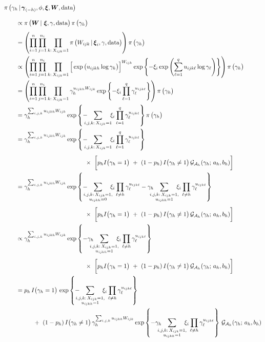 \documentclass[11pt]{article}
\renewcommand{\vec}{\boldsymbol}
\newcommand{\barS}{\,|\,}
\newcommand{\ind}{I}
\newcommand{\gammaExpr}{ -\hspace{3mm} \sum_{\mathclap{i,j,k{:}\, X_{ijk}=1}} \hspace{4mm} \xi_i \prod_{\ell=1}^q \gamma_\ell^{ u_{ijk\ell} } }
\newcommand{\gammaExprUisZero}{ \hspace{3mm} \sum_{\mathclap{\substack{i,j,k{:}\, X_{ijk}=1, \\ u_{ijkh} = 0}}} \hspace{4mm} \xi_i \prod_{\ell \ne h} \gamma_\ell^{ u_{ijk\ell} } }
\newcommand{\gammaExprUisOne}{ \hspace{3mm} \sum_{\mathclap{\substack{i,j,k{:}\, X_{ijk}=1, \\ u_{ijkh} = 1}}} \hspace{4mm} \xi_i \prod_{\ell \ne h} \gamma_\ell^{ u_{ijk\ell} } }
\begin{document}
\begin{enumerate}[label=Step \arabic*., leftmargin=13mm, itemsep=10mm]
\begin{align*} \MoveEqLeft
\pi\, \big( \gamma_h \barS \vec{\gamma}_{(-h)}, \phi, \vec{\xi}, \vec{W}, \text{data} \big) \\[2ex]
& \propto \pi\, \big( \vec{W} \barS\, \vec{\xi}, \gamma, \text{data} \big)\, \pi\,\big( \gamma_h \big) \\[1ex]
&= \left( \prod_{i=1}^{n} \prod_{j=1}^{n_i} \prod_{k{:}\, X_{ijk} = 1} \pi\, \big( W_{ijk} \barS \vec{\xi}_i, \gamma, \text{data} \big) \right) \pi\, \big( \gamma_h \big) \\
&\propto \left( \prod_{i=1}^{n} \prod_{j=1}^{n_i} \prod_{k{:}\, X_{ijk} = 1} \Big[ \exp\big( u_{ijkh} \log \gamma_h \big) \Big]^{W_{ijk}} \exp\left\{ -\xi_i \exp\left( \sum_{\ell=1}^q u_{ijk\ell} \log \gamma_{\ell} \right) \right\} \right) \pi\, \big( \gamma_h \big) \\
&= \left( \prod_{i=1}^{n} \prod_{j=1}^{n_i} \prod_{k{:}\, X_{ijk} = 1} \gamma_h^{ u_{ijkh} W_{ijk} } \exp\left\{ -\xi_i \prod_{\ell=1}^q \gamma_\ell^{ u_{ijk\ell} } \right\} \right) \pi\, \big( \gamma_h \big) \\
&= \gamma_h^{ \sum_{i,j,k} u_{ijkh} W_{ijk} } \exp\left\{ \gammaExpr \right\} \pi\, \big( \gamma_h \big) \\
&= \gamma_h^{ \sum_{i,j,k} u_{ijkh} W_{ijk} } \exp\left\{ \gammaExpr \right\} \\[1ex]
& \hspace{40mm} \times~ \bigg[ p_h \ind\big( \gamma_h = 1 \big) ~+~ (1 - p_h)\, \ind\big( \gamma_h \ne 1 \big)\, \mathcal{G}_{\mathcal{A}_h} (\gamma_h;\, a_h,b_h) \bigg] \\
&= \gamma_h^{ \sum_{i,j,k} u_{ijkh} W_{ijk} } \exp\left\{ -\gammaExprUisZero-\gamma_h\gammaExprUisOne \right\} \\[1ex]
& \hspace{40mm} \times~ \bigg[ p_h \ind\big( \gamma_h = 1 \big) ~+~ (1 - p_h)\, \ind\big( \gamma_h \ne 1 \big)\, \mathcal{G}_{\mathcal{A}_h} (\gamma_h;\, a_h,b_h) \bigg] \\
&\propto \gamma_h^{ \sum_{i,j,k} u_{ijkh} W_{ijk} } \exp\left\{-\gamma_h\gammaExprUisOne \right\} \\[1ex]
& \hspace{40mm} \times~ \bigg[ p_h \ind\big( \gamma_h = 1 \big) ~+~ (1 - p_h)\, \ind\big( \gamma_h \ne 1 \big)\, \mathcal{G}_{\mathcal{A}_h} (\gamma_h;\, a_h,b_h) \bigg] \\
&= p_h\, \ind\big( \gamma_h = 1 \big)\, \exp\left\{ -\gammaExprUisOne \right\} \\
& \hspace{10mm} +~ (1 - p_h)\, \ind\big(\gamma_h \ne 1 \big)\, \gamma_h^{ \sum_{i,j,k} u_{ijkh} W_{ijk} } \exp\left\{ -\gamma_h\gammaExprUisOne \right\} \, \mathcal{G}_{\mathcal{A}_h} (\gamma_h;\, a_h,b_h) \\

\end{align*}
\end{enumerate}
\end{document}
